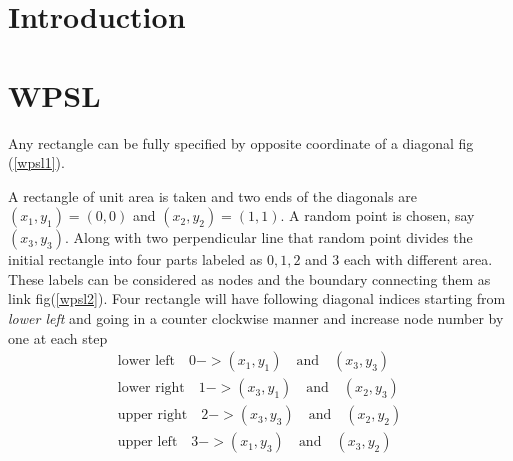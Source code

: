 \documentclass[10pt,a4paper]{report}
\begin{document}
	\section{Introduction}
	
	\section{WPSL}
	Any rectangle can be fully specified by opposite coordinate of a diagonal fig (\ref{wpsl1}). 
	
	A rectangle of unit area is taken and two ends of the diagonals are $(x_1, y_1)=(0,0)$ and $(x_2, y_2)=(1,1)$. A random point is chosen, say $(x_3, y_3)$. Along with two perpendicular line that random point divides the initial rectangle into four parts labeled as $0,1,2$ and $3$ each with different area. These labels can be considered as nodes and the boundary connecting them as link fig(\ref{wpsl2}).
	Four rectangle will have following diagonal indices starting from \textit{lower left} and going in a counter clockwise manner and increase node number by one at each step
	\begin{align}
		\text{lower left}\quad 0 -> (x_1, y_1) \quad \text{and} \quad (x_3, y_3) \\		
		\text{lower right}\quad 1 -> (x_3, y_1) \quad \text{and} \quad (x_2, y_3) \\
		\text{upper right}\quad 	2 -> (x_3, y_3) \quad \text{and} \quad (x_2, y_2) \\
		\text{upper left}\quad		3 -> (x_1, y_3) \quad \text{and} \quad (x_3, y_2) 
	\end{align}
	
\end{document}
